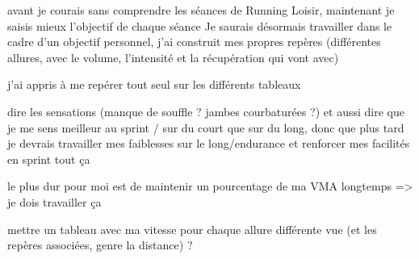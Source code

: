 \documentclass{article}
\begin{document}
    avant je courais sans comprendre les séances de Running Loisir, maintenant je saisis mieux l'objectif de chaque séance
    Je saurais désormais travailler dans le cadre d'un objectif personnel, j'ai construit mes propres repères (différentes allures, avec le volume, l'intensité et la récupération qui vont avec)
    
    j'ai appris à me repérer tout seul sur les différents tableaux
    
    
    dire les sensations (manque de souffle ? jambes courbaturées ?)
    et aussi dire que je me sens meilleur au sprint / sur du court
    que sur du long, donc que plus tard
    je devrais travailler mes faiblesses sur le long/endurance
    et renforcer mes facilités en sprint tout ça
    
    le plus dur pour moi est de maintenir un pourcentage de ma VMA longtemps => je dois travailler ça
    
    
    mettre un tableau avec ma vitesse pour chaque allure différente vue (et les repères associées, genre la distance) ?
\end{document}
